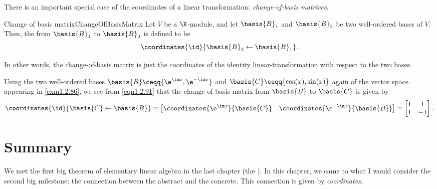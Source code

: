 There is an important special case of the coordinates of a linear transformation:  \emph{change-of-basis matrices}.
\begin{dfn}{Change of basis matrix}{ChangeOfBasisMatrix}
	Let $V$ be a $\K$-module, and let $\basis{B}_1$ and $\basis{B}_2$ be two well-ordered bases of $V$.  Then, the  from $\basis{B}_1$ to $\basis{B}_2$ is defined to be
	\begin{equation}
		\coordinates{\id}{\basis{B}_2\leftarrow \basis{B}_1}.
	\end{equation}
	\begin{rmk}
		In other words, the change-of-basis matrix is just the coordinates of the identity linear-transformation with respect to the two bases.
	\end{rmk}
\end{dfn}
\begin{exm}{}{}
	Using the two well-ordered bases $\basis{B}\ceqq \{ \e ^{\im x},\e ^{-\im x}\}$ and $\basis{C}\ceqq \{ \cos (x),\sin (x)\}$ again of the vector space appearing in \cref{exm1.2.86}, we see from \eqref{eqn1.2.91} that the change-of-basis matrix from $\basis{B}$ to $\basis{C}$ is given by
	\begin{equation}
		\coordinates{\id}{\basis{C}\leftarrow \basis{B}}=\begin{bmatrix}\coordinates{\e ^{\im x}}{\basis{C}} & \coordinates{\e ^{-\im x}}{\basis{B}}\end{bmatrix}=\begin{bmatrix}1 & 1 \\ 1 & -1\end{bmatrix}.
	\end{equation}
\end{exm}

\section{Summary}

We met the first big theorem of elementary linear algebra in the last chapter (the ).  In this chapter, we came to what I would consider the second big milestone:  the connection between the abstract and the concrete.  This connection is given by \emph{coordinates}.


